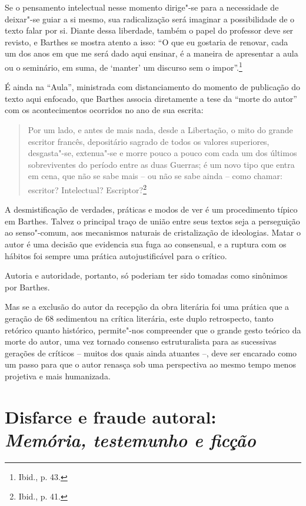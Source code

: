 Se o pensamento intelectual nesse momento dirige"-se para a necessidade
de deixar"-se guiar a si mesmo, sua radicalização será imaginar a
possibilidade de o texto falar por si. Diante dessa liberdade, também o
papel do professor deve ser revisto, e Barthes se mostra atento a isso:
``O que eu gostaria de renovar, cada um dos anos em que me será dado
aqui ensinar, é a maneira de apresentar a aula ou o seminário, em suma,
de `manter' um discurso sem o impor''.\footnote{Ibid., p. 43.}

É ainda na ``Aula'', ministrada com distanciamento do momento de
publicação do texto aqui enfocado, que Barthes associa diretamente a
tese da ``morte do autor'' com os acontecimentos ocorridos no ano de sua
escrita:

\begin{quote}
Por um lado, e antes de mais nada, desde a Libertação, o mito do grande
escritor francês, depositário sagrado de todos os valores superiores,
desgasta"-se, extenua"-se e morre pouco a pouco com cada um dos últimos
sobreviventes do período entre as duas Guerras; é um novo tipo que entra
em cena, que não se sabe mais -- ou não se sabe ainda -- como chamar:
escritor? Intelectual? Escriptor?\footnote{Ibid., p. 41.}
\end{quote}

A desmistificação de verdades, práticas e modos de ver é um procedimento
típico em Barthes. Talvez o principal traço de união entre seus textos
seja a perseguição ao senso"-comum, aos mecanismos naturais de
cristalização de ideologias. Matar o autor é uma decisão que evidencia
sua fuga ao consensual, e a ruptura com os hábitos foi sempre uma
prática autojustificável para o crítico.

Autoria e autoridade, portanto, só poderiam ter sido tomadas como
sinônimos por Barthes.

Mas se a exclusão do autor da recepção da obra literária foi uma prática
que a geração de 68 sedimentou na crítica literária, este duplo
retrospecto, tanto retórico quanto histórico, permite"-nos compreender
que o grande gesto teórico da morte do autor, uma vez tornado consenso
estruturalista para as sucessivas gerações de críticos -- muitos dos
quais ainda atuantes --, deve ser encarado como um passo para que o
autor renasça sob uma perspectiva ao mesmo tempo menos projetiva e mais
humanizada.

\chapter*{Disfarce e fraude autoral:\\ \emph{Memória, testemunho e ficção}}

